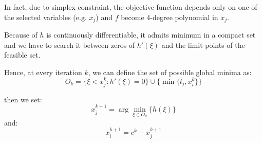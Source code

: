In fact, due to simplex constraint, the objective function depends only on one of the selected variables (e.g. $x_j$) and $f$ become 4-degree polynomial in $x_j$.

Because of $h$ is continuously differentiable, it admits minimum in a compact set and we have to search it between zeros of $h'(\xi)$ and the limit points of the feasible set.

Hence, at every iteration $k$, we can define the set of possible global minima as:
\begin{equation}
 O_k = \{ \xi < x_j^k: h'(\xi)=0\} \cup \{\min\{l_j,x_i^k\} \}
\end{equation}

then we set:
\begin{equation}
x_j^{k+1}= \arg \min_{\xi \in O_k} \{h(\xi)\}
\end{equation}
and:
\begin{equation}
x_i^{k+1}= c^{k}-x^{k+1}_j
\end{equation}



